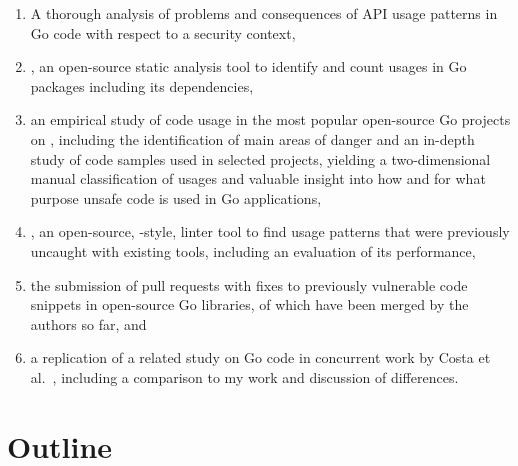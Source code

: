 \begin{enumerate}
    \item A thorough analysis of problems and consequences of \unsafe{} \acrshort{API} usage patterns in Go code with
    respect to a security context,

    \item \toolGeiger, an open-source static analysis tool to identify and count \unsafe{} usages in Go packages
    including its dependencies,

    \item an empirical study of \unsafe{} code usage in the \projsTotal{} most popular open-source Go projects on
    \github{}, including the identification of  main areas of danger and an in-depth study of
    \numberLabeledCodeSnippets{} code samples used in \projsForLabeledCodeSnippets{} selected projects, yielding a
    two-dimensional manual classification of usages and valuable insight into how and for what purpose unsafe code is
    used in Go applications,

    \item \toolSafer{}, an open-source, \toolVet{}-style, linter tool to find  \unsafe{} usage patterns
    that were previously uncaught with existing tools, including an evaluation of its performance,

    \item the submission of \numberPRs{} pull requests with fixes to \numberBugsFixed{} previously vulnerable code
    snippets in open-source Go libraries, \numberPRsMerged{} of which have been merged by the authors so far, and

    \item a replication of a related study on \unsafe{} Go code in concurrent work by Costa et al.~\cite{costa2020},
    including a comparison to my work and discussion of differences.
\end{enumerate}



\section{Outline}\label{sec:outline}

